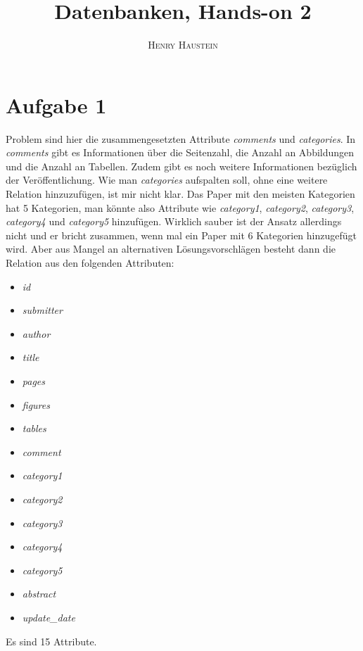 \documentclass{article}
\title{\textbf{Datenbanken, Hands-on 2}}
\author{\textsc{Henry Haustein}}
\date{}
\begin{document}
	\maketitle

	\section*{Aufgabe 1}
	Problem sind hier die zusammengesetzten Attribute \textit{comments} und \textit{categories}. In \textit{comments} gibt es Informationen über die Seitenzahl, die Anzahl an Abbildungen und die Anzahl an Tabellen. Zudem gibt es noch weitere Informationen bezüglich der Veröffentlichung. Wie man \textit{categories} aufspalten soll, ohne eine weitere Relation hinzuzufügen, ist mir nicht klar. Das Paper mit den meisten Kategorien hat 5 Kategorien, man könnte also Attribute wie \textit{category1}, \textit{category2}, \textit{category3}, \textit{category4} und \textit{category5} hinzufügen. Wirklich sauber ist der Ansatz allerdings nicht und er bricht zusammen, wenn mal ein Paper mit 6 Kategorien hinzugefügt wird. Aber aus Mangel an alternativen Lösungsvorschlägen besteht dann die Relation aus den folgenden Attributen:
	\begin{itemize}
		\item \textit{id}
		\item \textit{submitter}
		\item \textit{author}
		\item \textit{title}
		\item \textit{pages}
		\item \textit{figures}
		\item \textit{tables}
		\item \textit{comment}
		\item \textit{category1}
		\item \textit{category2}
		\item \textit{category3}
		\item \textit{category4}
		\item \textit{category5}
		\item \textit{abstract}
		\item \textit{update\_date}
	\end{itemize}
	Es sind 15 Attribute.
\end{document}
